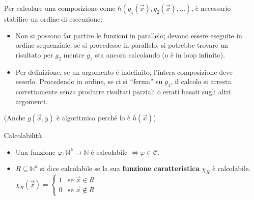 \documentclass[a4paper,11pt]{report}
\begin{document}
Per calcolare una composizione come $h(g_1(\vec{x}), g_2(\vec{x}), \dots)$, è necessario stabilire un ordine di esecuzione:
\begin{itemize}
    \item Non si possono far partire le funzioni in parallelo; devono essere eseguite in ordine sequenziale.
    \subitem se si procedesse in parallelo, si potrebbe trovare un risultato per $g_2$ mentre $g_1$ sta ancora calcolando (o è in loop infinito).
    \item Per definizione, se un argomento è indefinito, l'intera composizione deve esserlo. Procedendo in ordine, se ci si ``ferma'' su $g_1$, il calcolo si arresta correttamente senza produrre risultati parziali o errati basati sugli altri argomenti.
\end{itemize}

(Anche \( g(\vec{x}, y) \) è algoritmica perché lo è \( h(\vec{x}) \))

\begin{propframe}{Calcolabilità}{}
\begin{itemize}
    \item Una funzione $\varphi: \mathbb{N}^k \rightarrow \mathbb{N}$ è calcolabile $\iff \varphi \in \mathcal{C}$.
    \item  $R \subseteq \mathbb{N}^k$ si dice calcolabile se la sua \textbf{funzione caratteristica} $\chi_R$ è calcolabile.
    \subitem 
    \(
    \chi_R(\vec{x}) = \begin{cases} 
    1 & \text{se } \vec{x} \in R \\ 
    0 & \text{se } \vec{x} \notin R 
    \end{cases}
    \)
\end{itemize}
\end{propframe}
\end{document}
